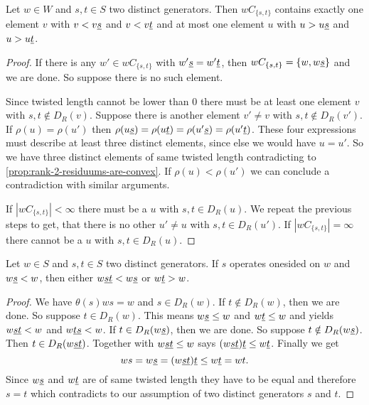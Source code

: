 \begin{coro}
	\todo
	Let $w \in W$ and $s,t \in S$ two distinct generators. Then $wC_{\{s,t\}}$ contains exactly one element $v$ with $v < v \underline{s}$ and $v < v \underline{t}$ and at most one element $u$ with $u > u \underline{s}$ and $u > u \underline{t}$.

	\begin{proof}
		If there is any $w' \in wC_{\{s,t\}}$ with $w' \underline{s} = w' \underline{t}$, then $wC_{\{s,t\}} = \{ w, w \underline{s} \}$ and we are done. So suppose there is no such element.

		Since twisted length cannot be lower than 0 there must be at least one element $v$ with $s,t \notin D_R(v)$. Suppose there is another element $v' \neq v$ with $s,t \notin D_R(v')$. If $\rho(u) = \rho(u')$ then $\rho(u \underline{s}) = \rho(u \underline{t}) = \rho(u' \underline{s}) = \rho(u' \underline{t})$. These four expressions must describe at least three distinct elements, since else we would have $u = u'$. So we have three distinct elements of same twisted length contradicting to \ref{prop:rank-2-residuums-are-convex}. If $\rho(u) < \rho(u')$ we can conclude a contradiction with similar arguments.

		If $|wC_{\{s,t\}}| < \infty$ there must be a $u$ with $s,t \in D_R(u)$. We repeat the previous steps to get, that there is no other $u' \neq u$ with $s,t \in D_R(u')$. If $|wC_{\{s,t\}}| = \infty$ there cannot be a $u$ with $s,t \in D_R(u)$.
	\end{proof}
\end{coro}

\begin{prop}
	\todo
	Let $w \in S$ and $s,t \in S$ two distinct generators. If $s$ operates onesided on $w$ and $w \underline{s} < w$, then either $w \underline{st} < w \underline{s}$ or $w \underline{t} > w$.

	\begin{proof}
		We have $\theta(s)ws = w$ and $s \in D_R(w)$. If $t \notin D_R(w)$, then we are done. So suppose $t \in D_R(w)$. This means $w \underline{s} \leq w$ and $w \underline{t} \leq w$ and \cite[Lemma 3.9]{hultman:comb-twisted-invo} yields $w \underline{st} < w$ and $w \underline{ts} < w$. If $t \in D_R(w \underline{s})$, then we are done. So suppose $t \notin D_R(w \underline{s})$. Then $t \in D_R(w \underline{st})$. Together with $w \underline{st} \leq w$ \cite[Lemma 3.9(2)]{hultman:comb-twisted-invo} says $(w \underline{st}) \underline{t} \leq w \underline{t}$. Finally we get
		$$ ws = w \underline{s} = (w \underline{st}) \underline{t} \leq w \underline{t} = wt.$$
		Since $w \underline{s}$ and $w \underline{t}$ are of same twisted length they have to be equal and therefore $s = t$ which contradicts to our assumption of two distinct generators $s$ and $t$.
	\end{proof}
\end{prop}

